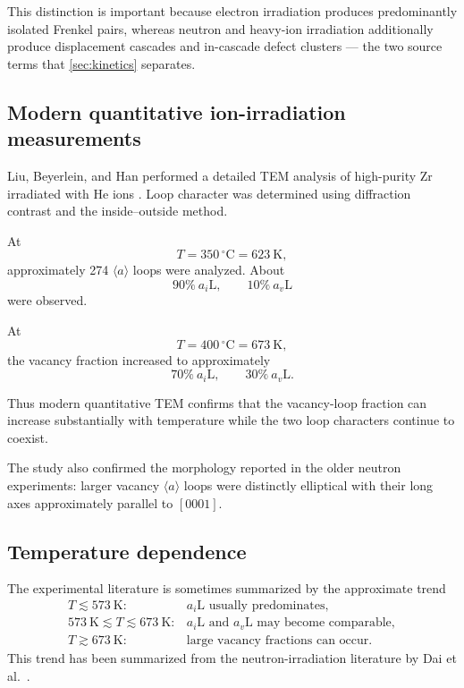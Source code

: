 \documentclass{article}
\newcommand{\aloop}{\ensuremath{\langle a\rangle}}
\newcommand{\aiL}{a_{i}\mathrm{L}}
\newcommand{\avL}{a_{v}\mathrm{L}}
\begin{document}
This distinction is important because electron irradiation produces
predominantly isolated Frenkel pairs, whereas neutron and heavy-ion irradiation
additionally produce displacement cascades and in-cascade defect clusters --- the
two source terms that \cref{sec:kinetics} separates.

\subsection{Modern quantitative ion-irradiation measurements}

Liu, Beyerlein, and Han performed a detailed TEM analysis of high-purity Zr
irradiated with He ions \citep{liu2020two}. Loop character was determined using
diffraction contrast and the inside--outside method.

At
\begin{equation}
    T=350\,^{\circ}\mathrm C
    =623~\mathrm K,
\end{equation}
approximately 274 \aloop{} loops were analyzed. About
\begin{equation}
    \boxed{
    90\%\ \aiL,
    \qquad
    10\%\ \avL
    }
\end{equation}
were observed.

At
\begin{equation}
    T=400\,^{\circ}\mathrm C
    =673~\mathrm K,
\end{equation}
the vacancy fraction increased to approximately
\begin{equation}
    \boxed{
    70\%\ \aiL,
    \qquad
    30\%\ \avL.
    }
\end{equation}

Thus modern quantitative TEM confirms that the vacancy-loop fraction can
increase substantially with temperature while the two loop characters continue
to coexist.

The study also confirmed the morphology reported in the older neutron
experiments: larger vacancy \aloop{} loops were distinctly elliptical with their
long axes approximately parallel to $[0001]$.

\subsection{Temperature dependence}

The experimental literature is sometimes summarized by the approximate trend
\begin{equation}
\begin{array}{ll}
T\lesssim573~\mathrm K:
&
\aiL\text{ usually predominates},
\\[1mm]
573~\mathrm K\lesssim T\lesssim673~\mathrm K:
&
\aiL\text{ and }\avL\text{ may become comparable},
\\[1mm]
T\gtrsim673~\mathrm K:
&
\text{large vacancy fractions can occur}.
\end{array}
\label{eq:experimental_temperature_trend}
\end{equation}
This trend has been summarized from the neutron-irradiation literature by Dai
et al.\ \citep{dai2021stability}.
\end{document}
